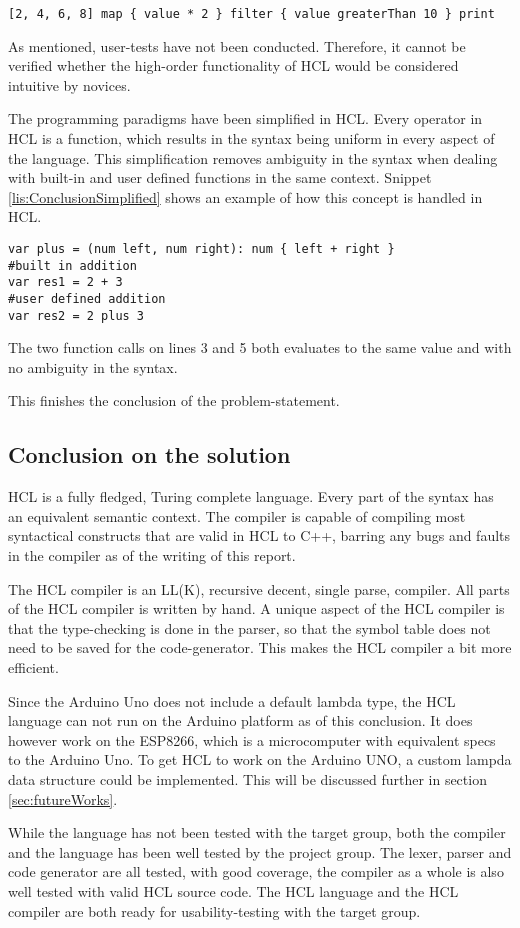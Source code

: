 \begin{lstlisting}[language=hcl,label=lis:ConclusionMapFilter,caption=High-order functionality in HCL]
[2, 4, 6, 8] map { value * 2 } filter { value greaterThan 10 } print
\end{lstlisting}

As mentioned, user-tests have not been conducted.
Therefore, it cannot be verified whether the high-order functionality of HCL would be considered intuitive by novices.

The programming paradigms have been simplified in HCL.
Every operator in HCL is a function, which results in the syntax being uniform in every aspect of the language.
This simplification removes ambiguity in the syntax when dealing with built-in and user defined functions in the same context.
Snippet \ref{lis:ConclusionSimplified} shows an example of how this concept is handled in HCL.

\begin{lstlisting}[language=hcl,label=lis:ConclusionSimplified,caption=Built-in and user defined function]
var plus = (num left, num right): num { left + right }
#built in addition
var res1 = 2 + 3
#user defined addition
var res2 = 2 plus 3 
\end{lstlisting}

The two function calls on lines 3 and 5 both evaluates to the same value and with no ambiguity in the syntax.

This finishes the conclusion of the problem-statement.

\subsection{Conclusion on the solution} %
HCL is a fully fledged, Turing complete language.
Every part of the syntax has an equivalent semantic context. 
The compiler is capable of compiling most syntactical constructs that are valid in HCL to C++, barring any bugs and faults in the compiler as of the writing of this report.

The HCL compiler is an LL(K), recursive decent, single parse, compiler.
All parts of the HCL compiler is written by hand.
A unique aspect of the HCL compiler is that the type-checking is done in the parser, so that the symbol table does not need to be saved for the code-generator.
This makes the HCL compiler a bit more efficient.

Since the Arduino Uno does not include a default lambda type, the HCL language can not run on the Arduino platform as of this conclusion.
It does however work on the ESP8266, which is a microcomputer with equivalent specs to the Arduino Uno.
To get HCL to work on the Arduino UNO, a custom lampda data structure could be implemented.
This will be discussed further in section \ref{sec:futureWorks}.

While the language has not been tested with the target group, both the compiler and the language has been well tested by the project group.
The lexer, parser and code generator are all tested, with good coverage, the compiler as a whole is also well tested with valid HCL source code.
The HCL language and the HCL compiler are both ready for usability-testing with the target group.



